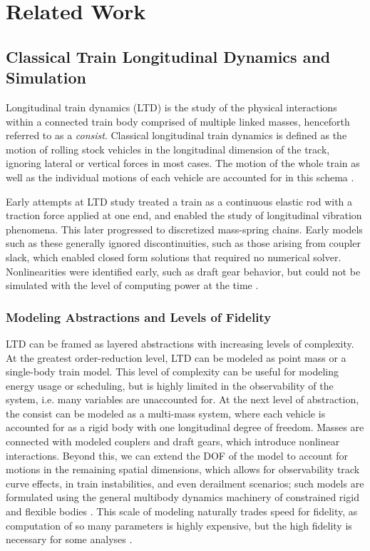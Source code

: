 \chapter{Related Work}
\label{ch:related}

\section{Classical Train Longitudinal Dynamics and Simulation}

Longitudinal train dynamics (LTD) is the study of the physical interactions within a connected train body comprised of multiple linked masses, henceforth referred to as a \textit{consist}. Classical longitudinal train dynamics is defined as the motion of rolling stock vehicles in the longitudinal dimension of the track, ignoring lateral or vertical forces in most cases. The motion of the whole train as well as the individual motions of each vehicle are accounted for in this schema \cite{Cole2006HandbookLTD}.

Early attempts at LTD study treated a train as a continuous elastic rod with a traction force applied at one end, and enabled the study of longitudinal vibration phenomena. This later progressed to discretized mass-spring chains. Early models such as these generally ignored discontinuities, such as those arising from coupler slack, which enabled closed form solutions that required no numerical solver. Nonlinearities were identified early, such as draft gear behavior, but could not be simulated with the level of computing power at the time \cite{Wu2016OverviewLTD}. 

\subsection{Modeling Abstractions and Levels of Fidelity}

LTD can be framed as layered abstractions with increasing levels of complexity. At the greatest order-reduction level, LTD can be modeled as point mass or a single-body train model. This level of complexity can be useful for modeling energy usage or scheduling, but is highly limited in the observability of the system, i.e. many variables are unaccounted for. At the next level of abstraction, the consist can be modeled as a multi-mass system, where each vehicle is accounted for as a rigid body with one longitudinal degree of freedom. Masses are connected with modeled couplers and draft gears, which introduce nonlinear interactions. Beyond this, we can extend the DOF of the model to account for motions in the remaining spatial dimensions, which allows for observability track curve effects, in train instabilities, and even derailment scenarios; such models are formulated using the general multibody dynamics machinery of constrained rigid and flexible bodies \cite{shabana_multibody}. This scale of modeling naturally trades speed for fidelity, as computation of so many parameters is highly expensive, but the high fidelity is necessary for some analyses \cite{Wu2016OverviewLTD}.

